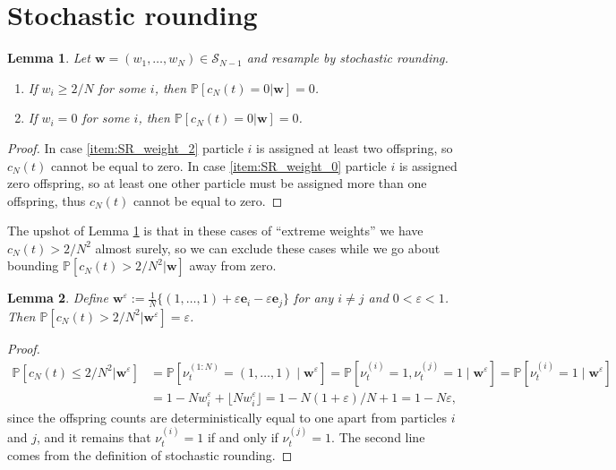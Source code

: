 \documentclass{article}
\newtheorem{lemma}{Lemma}
\newcommand{\PR}{\mathbb{P}}
\begin{document}
\section*{Stochastic rounding}
\begin{lemma} \label{lem:extreme_w_coal_as}
Let $\mathbf{w} = (w_1,\dots,w_N) \in \mathcal{S}_{N-1}$ and resample by stochastic rounding.
\begin{enumerate}[label=(\roman*)]
\item If $w_i \geq 2/N$ for some $i$, then $\PR[c_N(t) =0 |\mathbf{w} ] =0$. \label{item:SR_weight_2}
\item If $w_i= 0$ for some $i$, then $\PR[c_N(t) =0 |\mathbf{w} ] =0$. \label{item:SR_weight_0}
\end{enumerate}
\end{lemma}

\begin{proof}
In case \ref{item:SR_weight_2} particle $i$ is assigned at least two offspring, so $c_N(t)$ cannot be equal to zero.
In case \ref{item:SR_weight_0} particle $i$ is assigned zero offspring, so at least one other particle must be assigned more than one offspring, thus $c_N(t)$ cannot be equal to zero.
\end{proof}

The upshot of Lemma \ref{lem:extreme_w_coal_as} is that in these cases of ``extreme weights'' we have $c_N(t) > 2/N^2$ almost surely, so we can exclude these cases while we go about bounding $\PR[c_N(t) > 2/N^2 | \mathbf{w}]$ away from zero.


\begin{lemma}\label{lem:weps_cN_prob}
Define $\mathbf{w}^\varepsilon := \frac{1}{N}\{(1,\dots,1) + \varepsilon \mathbf{e}_i - \varepsilon \mathbf{e}_j \}$ for any $i \neq j$ and $0< \varepsilon < 1$. Then $\PR[c_N(t) > 2/N^2 | \mathbf{w}^\varepsilon] = \varepsilon$.
\end{lemma}

\begin{proof}
\begin{align*}
\PR[c_N(t) \leq 2/N^2 | \mathbf{w}^\varepsilon]
&= \PR[\nu_t^{(1:N)} = (1,\dots, 1) \mid \mathbf{w}^\varepsilon] 
= \PR[\nu_t^{(i)} = 1, \nu_t^{(j)} = 1 \mid \mathbf{w}^\varepsilon] 
= \PR[\nu_t^{(i)} = 1 \mid \mathbf{w}^\varepsilon] \\
&= 1- N w_i^\varepsilon + \lfloor N w_i^\varepsilon \rfloor 
= 1- N(1+ \varepsilon)/N + 1
= 1 - N\varepsilon ,
\end{align*}
since the offspring counts are deterministically equal to one apart from particles $i$ and $j$, and it remains that $\nu_t^{(i)} = 1$ if and only if $\nu_t^{(j)} = 1$. The second line comes from the definition of stochastic rounding.
\end{proof}
\end{document}
